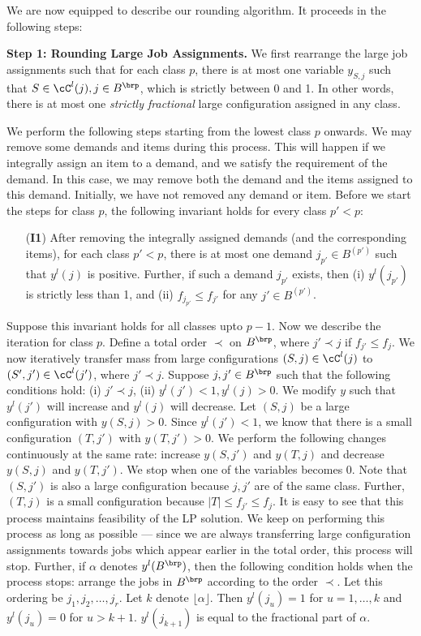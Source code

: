 \medskip \noindent We are now equipped to describe our rounding algorithm. It proceeds in the following steps:



\medskip \noindent
{\bf Step 1: Rounding Large Job Assignments.} We first rearrange the large job assignments such that for each class $p$, there is at most one variable $y_{S,j}$ such that $S \in \cC^l(j), j \in B^\brp$, which is strictly between 0 and 1. In other words, there is at most one \emph{strictly fractional} large configuration assigned in any class.

We perform the following steps starting from the lowest class $p$ onwards.
We may remove some demands and items during this process. This will happen if we integrally assign an item to a demand, and we satisfy the requirement of the demand. In this case, we may remove both the demand and the items assigned to this demand. Initially, we have  not removed any demand or 
item. Before we start the steps for class $p$, the following invariant holds for every class $p' < p$:

\begin{itemize}
\item[({\bf I1})] After removing the integrally assigned demands (and the corresponding items), for each class $p' < p$, there is at most one  demand $j_{p'} \in B^{(p')}$ such that $y^l(j)$ is positive. Further, if such a demand $j_{p'}$ exists, then (i) $y^l(j_{p'})$ is strictly less than 1, and 
(ii) $f_{j_{p'}} \leq f_{j'}$ for any $j' \in B^{(p')}$.
\end{itemize}

Suppose this invariant holds for all classes upto $p-1$. Now we describe the iteration for class $p$.
Define a total order $\prec$ on $B^\brp$, where $j' \prec j$ if $f_{j'} \leq f_{j}$.  We now iteratively transfer mass from large configurations $(S,j) \in \cC^l(j)$ to $(S',j') \in \cC^l(j')$, where $j' \prec j$. Suppose $j,j' \in B^\brp$ such that the following conditions hold: (i) $j' \prec j$, (ii) $y^l(j') < 1, y^l(j) > 0$. We modify $y$ such that
$y^l(j')$ will increase and $y^l(j)$ will decrease. Let $(S,j)$ be a large configuration with $y(S,j) > 0$. Since $y^l(j') < 1$, we know that there is a small configuration $(T,j')$ with $y(T,j') > 0$. We perform the following changes continuously at the same rate: increase $y(S,j')$ and $y(T,j)$ and decrease $y(S,j)$ and $y(T,j')$. We stop when one of the variables becomes 0. Note that $(S,j')$ is also a large configuration because $j,j'$ are of the same class. Further, $(T,j)$ is a small configuration because $|T| \leq f_{j'} \leq f_j$. It is easy to see that this process maintains feasibility of the LP solution. We keep on performing this process as long as possible --- since we are always transferring large configuration assignments towards jobs which appear earlier in the total order, this process will stop. Further, if $\alpha$ denotes $y^l(B^\brp)$, then the following condition holds when the process stops: arrange the jobs in $B^\brp$ according to the order $\prec$. Let this ordering be $j_1, j_2, \ldots, j_r$. Let $k$ denote $\lfloor \alpha \rfloor$. Then $y^l(j_u) = 1$ for $u=1, \ldots, k$ and $y^l(j_u) = 0$ for $u > k+1$. $y^l(j_{k+1})$ is equal to the fractional part of $\alpha$.

